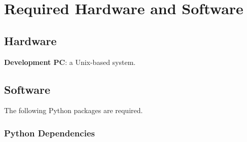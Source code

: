 \section{Required Hardware and Software}

\subsection{Hardware}
\textbf{Development PC}: a Unix-based system.

\subsection{Software}

The following Python packages are required. 

\subsubsection*{Python Dependencies}
\noindent

